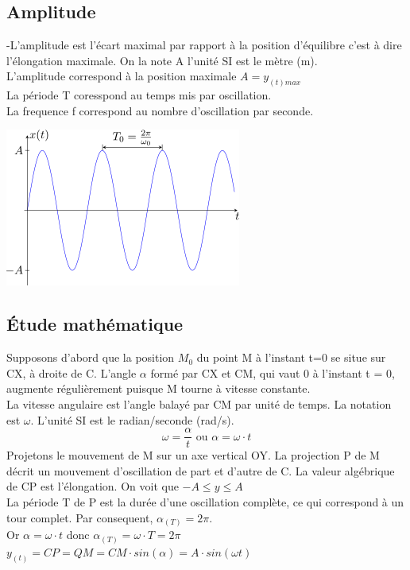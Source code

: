 \documentclass[11pt]{article}
\begin{document}
\subsection{Amplitude}
-L'amplitude est l'écart maximal par rapport à la position d'équilibre c'est à dire l'élongation maximale. On la note A l'unité SI est le mètre (m).\\
L'amplitude correspond à la position maximale $ A = y_{(t)max}$\\
La période T coresspond au temps mis par oscillation.\\
La frequence f correspond au nombre d'oscillation par seconde.
\begin{center}
    \includegraphics{oscillateur_harmonique.png}
\end{center}

\newpage
\subsection{Étude mathématique}
Supposons d'abord que la position $M_{0}$ du point M à l'instant t=0 se situe sur CX, à droite de C. L'angle $\alpha$ formé par CX et CM, qui vaut 0 à l'instant t = 0, augmente régulièrement puisque M tourne à vitesse constante.\\
La vitesse angulaire est l'angle balayé par CM par unité de temps. La notation est $\omega$. L'unité SI est le radian/seconde (rad/s).\\
$$\omega = \dfrac{\alpha}{t} \text{ ou } \alpha=\omega \cdot t$$
Projetons le mouvement de M sur un axe vertical OY. La projection P de M décrit un mouvement d'oscillation de part et d'autre de C. La valeur algébrique de CP est l'élongation. On voit que $-A \leqslant y \leqslant A $\\
La période T de P est la durée d'une oscillation complète, ce qui correspond à un tour complet. Par consequent, $\alpha _{(T)}=2\pi$.\\
Or $\alpha=\omega \cdot t$ donc $\alpha _{(T)}=\omega \cdot T = 2\pi$\\
$y_{(t)} = CP = QM = CM \cdot sin(\alpha) = A \cdot sin(\omega t)$
\end{document}
